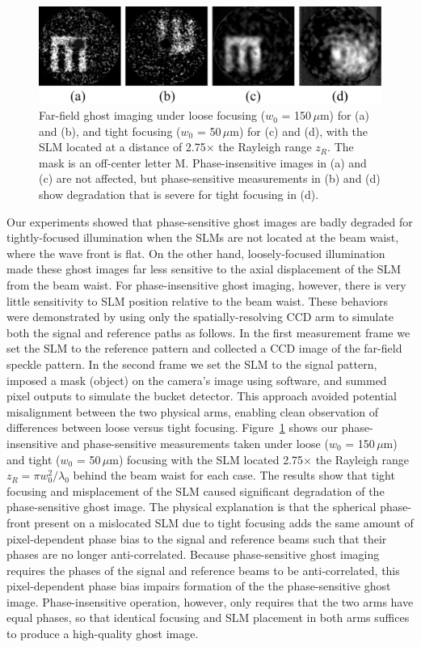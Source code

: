\begin{figure}[htb]
\centerline{\includegraphics[width=14cm]{figure-ghost-blur.pdf}}
\caption{Far-field ghost imaging under loose focusing ($w_0$ = 150\,$\mu$m) for (a) and (b), and tight focusing ($w_0$ = 50\,$\mu$m) for (c) and (d), with the SLM located at a distance of 2.75$\times$ the Rayleigh range $z_R$. The mask is an off-center letter M.  
Phase-insensitive images in (a) and (c) are not affected, but 
phase-sensitive measurements in (b) and (d) show degradation that is severe for tight focusing in (d).}
\label{figure:ghost-blur}
\end{figure}

Our experiments showed that phase-sensitive ghost images are badly degraded for tightly-focused illumination when the SLMs are not located at the beam waist, where the wave front is flat. On the other hand, loosely-focused illumination made these ghost images far less sensitive to the axial displacement of the SLM from the beam waist. For phase-insensitive ghost imaging, however, there is very little sensitivity to SLM position relative to the beam waist.  These behaviors were demonstrated by using only the spatially-resolving CCD arm to simulate both the signal and reference paths as follows.  In the first measurement frame we set the SLM to the reference pattern and collected a CCD image of the far-field speckle pattern.  In the second frame we set the SLM to the signal pattern, imposed a mask (object) on the camera's image using software, and summed pixel outputs to simulate the bucket detector. This approach avoided potential misalignment between the two physical arms, enabling clean observation of differences between loose versus tight focusing. Figure~\ref{figure:ghost-blur} shows our phase-insensitive and phase-sensitive measurements taken under loose ($w_0$ = 150\,$\mu$m) and tight ($w_0$ = 50\,$\mu$m) focusing with the SLM located 2.75$\times$ the Rayleigh range $z_R=\pi w_0^2/\lambda_0$ behind the beam waist for each case. The results show that tight focusing and misplacement of the SLM caused significant degradation of the phase-sensitive ghost image. The physical explanation is that the spherical phase-front present on a mislocated SLM due to tight focusing adds the same amount of pixel-dependent phase bias to the signal and reference beams such that their phases are no longer anti-correlated.   Because phase-sensitive ghost imaging requires the phases of the signal and reference beams to be anti-correlated, this pixel-dependent phase bias impairs formation of the the phase-sensitive ghost image.  Phase-insensitive operation, however, only requires that the two arms have equal phases, so that identical focusing and SLM placement in both arms suffices to produce a high-quality ghost image.

